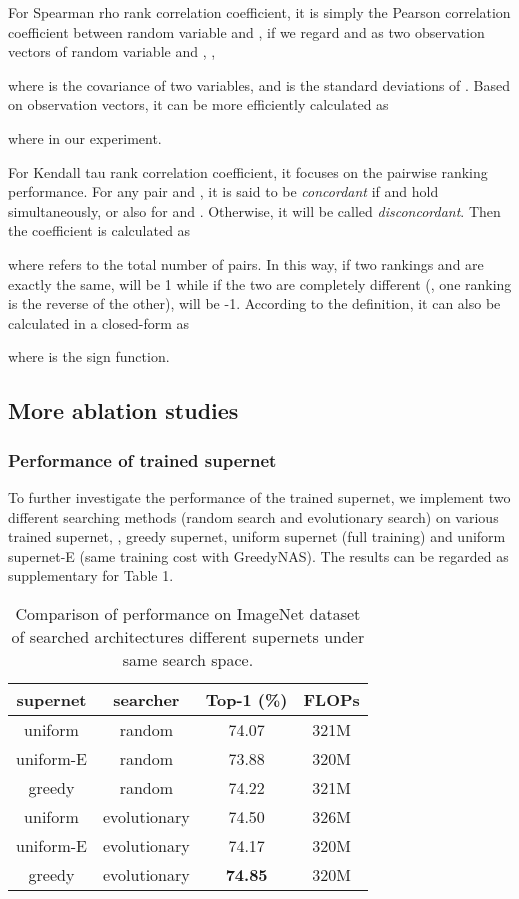 \documentclass[10pt,twocolumn,letterpaper]{article}
\begin{document}
For Spearman rho rank correlation coefficient, it is simply the Pearson correlation coefficient between random variable  and , if we regard  and  as two observation vectors of random variable  and , \ie,

where  is the covariance of two variables, and  is the standard deviations of . Based on observation vectors, it can be more efficiently calculated as 

where  in our experiment. 

For Kendall tau rank correlation coefficient, it focuses on the pairwise ranking performance. For any pair  and , it is said to be \textit{concordant} if  and  hold simultaneously, or also for  and . Otherwise, it will be called \textit{disconcordant}. Then the coefficient is calculated as 

where  refers to the total number of pairs. In this way, if two rankings   and  are exactly the same,  will be 1 while if the two are completely different (\ie, one ranking is the reverse of the other),  will be -1. According to the definition, it can also be calculated in a closed-form as

where  is the sign function. 




\subsection{More ablation studies}

\subsubsection{Performance of trained supernet}
To further investigate the performance of the trained supernet, we implement two different searching methods (random search and evolutionary search) on various trained supernet, \ie, greedy supernet, uniform supernet (full training) and uniform supernet-E (same training cost with GreedyNAS). 
The results can be regarded as supplementary for Table 1. 

\begin{table}[h]
	\caption{Comparison of performance on ImageNet dataset of searched architectures \wrt different supernets under same search space.}
	\label{tbl:supernet}
	\centering
\begin{tabular}{c|c||c|c} 
		supernet & searcher & Top-1 (\%)&FLOPs\\ \hline
		uniform& random&74.07&321M\\
		uniform-E & random&73.88&320M \\
		greedy & random&74.22& 321M \\ \hline
		uniform& evolutionary& 74.50&326M\\ 
		uniform-E& evolutionary&74.17 &320M\\ 
		greedy	&evolutionary&\textbf{74.85} &320M\\ \hline
\end{tabular}	
\end{table}
\end{document}
